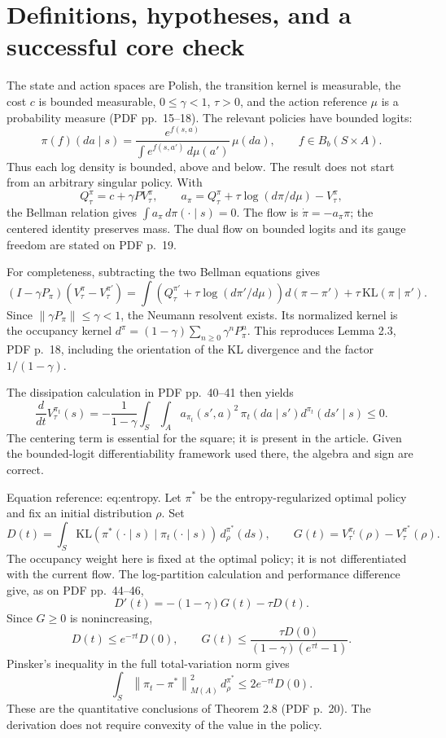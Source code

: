 \documentclass[10pt]{article}
\begin{document}
\section*{Definitions, hypotheses, and a successful core check}
The state and action spaces are Polish, the transition kernel is measurable, the cost \(c\) is bounded measurable, \(0\le\gamma<1\), \(\tau>0\), and the action reference \(\mu\) is a probability measure (PDF pp. 15–18). The relevant policies have bounded logits: \[\pi(f)(da\mid s)=\frac{e^{f(s,a)}}{\int e^{f(s,a')}\,d\mu(a')}\,\mu(da),
 \qquad f\in B_b(S\times A).\] Thus each log density is bounded, above and below. The result does not start from an arbitrary singular policy. With \[Q_\tau^\pi=c+\gamma PV_\tau^\pi,\qquad
 a_\pi=Q_\tau^\pi+\tau\log(d\pi/d\mu)-V_\tau^\pi,\] the Bellman relation gives \(\int a_\pi\,d\pi(\cdot\mid s)=0\). The flow is \(\dot\pi=-a_\pi\pi\); the centered identity preserves mass. The dual flow on bounded logits and its gauge freedom are stated on PDF p. 19.\par
For completeness, subtracting the two Bellman equations gives \[(I-\gamma P_\pi)(V_\tau^\pi-V_\tau^{\pi'})
 =\int\left(Q_\tau^{\pi'}+\tau\log(d\pi'/d\mu)\right)
                  d(\pi-\pi')
   +\tau\,\mathrm{KL}(\pi\mid\pi').\] Since \(\left\lVert\gamma P_\pi\right\rVert\le\gamma<1\), the Neumann resolvent exists. Its normalized kernel is the occupancy kernel \(d^\pi=(1-\gamma)\sum_{n\ge0}\gamma^nP_\pi^n\). This reproduces Lemma 2.3, PDF p. 18, including the orientation of the KL divergence and the factor \(1/(1-\gamma)\).\par
The dissipation calculation in PDF pp. 40–41 then yields \[\frac{d}{dt}V_\tau^{\pi_t}(s)
 =-\frac1{1-\gamma}\int_S\int_A a_{\pi_t}(s',a)^2
                \,\pi_t(da\mid s')d^{\pi_t}(ds'\mid s)\le0.\] The centering term is essential for the square; it is present in the article. Given the bounded-logit differentiability framework used there, the algebra and sign are correct.\par
Equation reference: eq:entropy. Let \(\pi^*\) be the entropy-regularized optimal policy and fix an initial distribution \(\rho\). Set \[D(t)=\int_S\mathrm{KL}(\pi^*(\cdot\mid s)\mid\pi_t(\cdot\mid s))
                      \,d_\rho^{\pi^*}(ds),\qquad
 G(t)=V_\tau^{\pi_t}(\rho)-V_\tau^{\pi^*}(\rho).\] The occupancy weight here is fixed at the optimal policy; it is not differentiated with the current flow. The log-partition calculation and performance difference give, as on PDF pp. 44–46, \[
 D'(t)=-(1-\gamma)G(t)-\tau D(t).\] Since \(G\ge0\) is nonincreasing, \[D(t)\le e^{-\tau t}D(0),\qquad
 G(t)\le\frac{\tau D(0)}{(1-\gamma)(e^{\tau t}-1)}.\] Pinsker’s inequality in the full total-variation norm gives \[\int_S\left\lVert\pi_t-\pi^*\right\rVert_{M(A)}^2\,d_\rho^{\pi^*}
 \le2e^{-\tau t}D(0).\] These are the quantitative conclusions of Theorem 2.8 (PDF p. 20). The derivation does not require convexity of the value in the policy.\par
\end{document}
